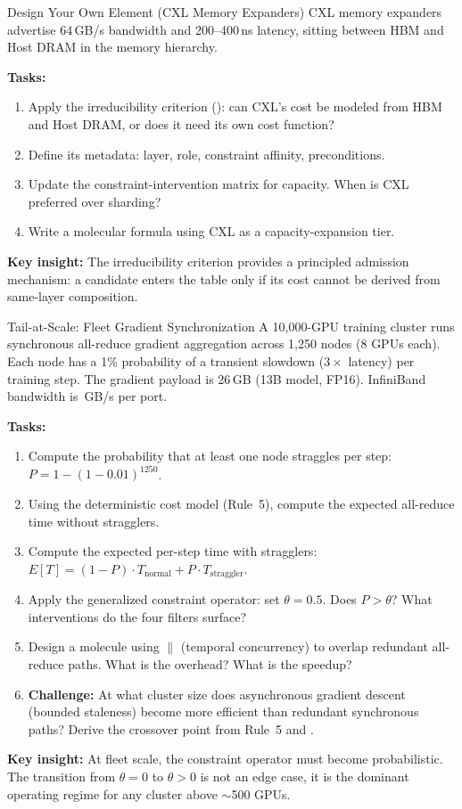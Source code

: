 \documentclass[10pt,twocolumn]{article}
\newcommand{\cvalint}[1]{\pgfmathprintnumber[fixed, precision=0, 1000 sep={\,}]{#1}}
\begin{document}
\begin{exercise}{Design Your Own Element (CXL Memory Expanders)}
CXL memory expanders advertise 64\,GB/s bandwidth and 200--400\,ns latency, sitting between HBM and Host DRAM in the memory hierarchy.

\textbf{Tasks:}
\begin{enumerate}[nosep, leftmargin=*]
\item Apply the irreducibility criterion (): can CXL's cost be modeled from HBM and Host DRAM, or does it need its own cost function?
\item Define its metadata: layer, role, constraint affinity, preconditions.
\item Update the constraint-intervention matrix for capacity. When is CXL preferred over sharding?
\item Write a molecular formula using CXL as a capacity-expansion tier.
\end{enumerate}

\textbf{Key insight:} The irreducibility criterion provides a principled admission mechanism: a candidate enters the table only if its cost cannot be derived from same-layer composition.
\end{exercise}

\begin{exercise}{Tail-at-Scale: Fleet Gradient Synchronization}
A 10,000-GPU training cluster runs synchronous all-reduce gradient aggregation across 1,250 nodes (8 GPUs each). Each node has a 1\% probability of a transient slowdown ($3\times$ latency) per training step. The gradient payload is 26\,GB (13B model, FP16). InfiniBand bandwidth is \cvalint{\IBBWGBs}\,GB/s per port.

\textbf{Tasks:}
\begin{enumerate}[nosep, leftmargin=*]
\item Compute the probability that at least one node straggles per step: $P = 1 - (1 - 0.01)^{1250}$.
\item Using the deterministic cost model (Rule~5), compute the expected all-reduce time without stragglers.
\item Compute the expected per-step time with stragglers: $E[T] = (1{-}P) \cdot T_{\text{normal}} + P \cdot T_{\text{straggler}}$.
\item Apply the generalized constraint operator: set $\theta = 0.5$. Does $P > \theta$? What interventions do the four filters surface?
\item Design a molecule using $\parallel$ (temporal concurrency) to overlap redundant all-reduce paths. What is the overhead? What is the speedup?
\item \textbf{Challenge:} At what cluster size does asynchronous gradient descent (bounded staleness) become more efficient than redundant synchronous paths? Derive the crossover point from Rule~5 and .
\end{enumerate}

\textbf{Key insight:} At fleet scale, the constraint operator must become probabilistic. The transition from $\theta = 0$ to $\theta > 0$ is not an edge case, it is the dominant operating regime for any cluster above ${\sim}$500 GPUs.
\end{exercise}
\end{document}
